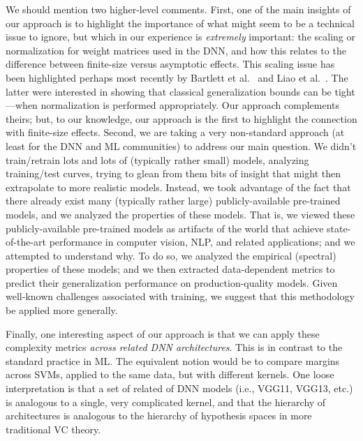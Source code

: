 {We should mention two higher-level comments.
%
First, 
one of the main insights of our approach is to highlight the importance of what might seem to be a technical issue to ignore, but which in our experience is \emph{extremely} important: the scaling or normalization for weight matrices used in the DNN, and how this relates to the difference between finite-size versus asymptotic effects.
This scaling issue has been highlighted perhaps most recently by Bartlett et al.~\cite{BFT17_TR} and Liao et al.~\cite{LMBx18_TR}.
The latter were interested in showing that classical generalization bounds can be tight---when normalization is performed appropriately.
Our approach complements theirs; but, to our knowledge, our approach is the first to highlight the connection with finite-size effects.
%
Second, 
we are taking a 
very %
non-standard approach (at least for the DNN and ML communities) to address our main question.
We didn't train/retrain lots and lots of (typically rather small) models, analyzing training/test curves, trying to glean from them bits of insight that might then extrapolate to more realistic models.
Instead, we took advantage of the fact that there already exist many (typically rather large) publicly-available pre-trained models, and we analyzed the properties of these models.
That is, we viewed these publicly-available pre-trained models as artifacts of the world that achieve state-of-the-art performance in computer vision, NLP, and related applications; and we attempted to understand why.
To do so, we analyzed the empirical (spectral) properties of these models; 
and we then extracted data-dependent metrics to predict their generalization performance on production-quality models.
Given well-known challenges associated with training, 
we suggest that this methodology be applied more generally.

Finally, one interesting aspect of our approach is that we can apply these complexity metrics \emph{across related DNN architectures}. 
This is in contrast to the standard practice in ML.
The equivalent notion would be to compare margins across SVMs, applied to the same data, but with different kernels. 
One loose interpretation is that a set of related of DNN models (i.e., VGG11, VGG13, etc.) is analogous to a single, very complicated kernel, and that the hierarchy of architectures is analogous to the hierarchy of hypothesis spaces in more traditional VC theory.

}
